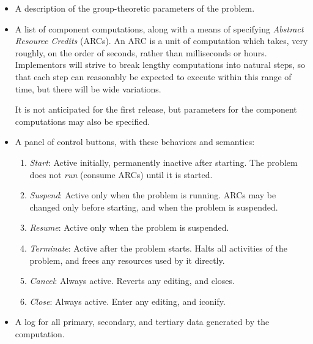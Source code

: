 \begin{itemize}

\item
A description of the group-theoretic parameters of the problem.

\item
A list of component computations, along with a means of specifying
{\em Abstract Resource Credits} (ARCs).  An ARC is a unit of
computation which takes, very roughly, on the order of seconds, rather
than milliseconds or hours. Implementors will strive to break lengthy
computations into natural steps, so that each step can reasonably be
expected to execute within this range of time, but there will be wide
variations.

It is not anticipated for the first release, but parameters for the
component computations may also be specified.

\item
A panel of control buttons, with these behaviors and semantics:

\begin{enumerate}

\item
{\em Start}: Active initially, permanently inactive after starting.
The problem does not {\em run} (consume ARCs) until it is started.

\item
{\em Suspend}: Active only when the problem is running. ARCs may be
changed only before starting, and when the problem is suspended.

\item
{\em Resume}: Active only when the problem is suspended.

\item
{\em Terminate}: Active after the problem starts. Halts all activities
of the problem, and frees any resources used by it directly.

\item
{\em Cancel}: Always active. Reverts any editing, and closes.

\item
{\em Close}: Always active. Enter any editing, and iconify.

\end{enumerate}


\item
A log for all primary, secondary, and tertiary data generated by the
computation.

\end{itemize}



